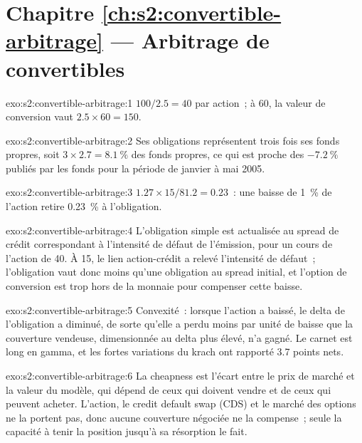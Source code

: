 \section*{Chapitre \ref{ch:s2:convertible-arbitrage} --- Arbitrage de convertibles}

\begin{solution}{exo:s2:convertible-arbitrage:1}
$100/2.5 = 40$ par action~; à 60, la valeur de conversion vaut $2.5 \times 60 = 150$.
\end{solution}

\begin{solution}{exo:s2:convertible-arbitrage:2}
Ses obligations représentent trois fois ses fonds propres, soit $3 \times 2.7 = 8.1~\%$ des fonds propres, ce qui est proche des $-7.2~\%$ publiés par les fonds pour la période de janvier à mai 2005.
\end{solution}

\begin{solution}{exo:s2:convertible-arbitrage:3}
$1.27 \times 15/81.2 = 0.23$~: une baisse de 1~\% de l'action retire 0.23~\% à l'obligation.
\end{solution}

\begin{solution}{exo:s2:convertible-arbitrage:4}
L'obligation simple est actualisée au spread de crédit correspondant à l'intensité de défaut de l'émission, pour un cours de l'action de 40. À 15, le lien action-crédit a relevé
l'intensité de défaut~; l'obligation vaut donc moins qu'une obligation au spread initial, et l'option de conversion est trop hors de la monnaie pour compenser cette baisse.
\end{solution}

\begin{solution}{exo:s2:convertible-arbitrage:5}
Convexité~: lorsque l'action a baissé, le delta de l'obligation a diminué, de sorte qu'elle a perdu moins par unité de baisse que la couverture vendeuse, dimensionnée au delta plus élevé, n'a gagné. Le carnet
est long en gamma, et les fortes variations du krach ont rapporté 3.7 points nets.
\end{solution}

\begin{solution}{exo:s2:convertible-arbitrage:6}
La cheapness est l'écart entre le prix de marché et la valeur du modèle, qui dépend de ceux qui doivent vendre et de ceux qui peuvent acheter. L'action, le credit default swap (CDS) et le
marché des options ne la portent pas, donc aucune couverture négociée ne la compense~; seule la capacité à tenir la position jusqu'à sa résorption le fait.
\end{solution}


